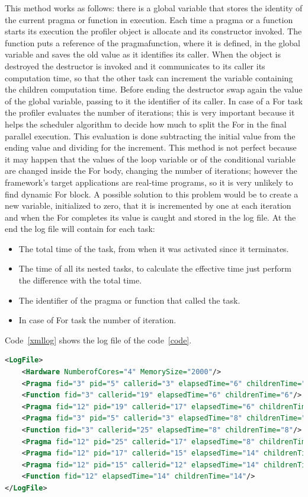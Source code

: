 \documentclass[a4paper,11pt,oneside]{book}
\begin{document}
This method works as follows: there is a global variable that stores the identity of the current pragma or function in execution. Each time a pragma or a function starts its execution the profiler object is allocate and its constructor invoked. The function puts a reference of the pragma\/function, where it is defined, in the global variable and saves the old value as it identifies its caller. When the object is destroyed the destructor is invoked and it communicates to its caller its computation time, so that the other task can increment the variable containing the children computation time. Before ending the destructor swap again the value of the global variable, passing to it the identifier of its caller. 
In case of a For task the profiler evaluates the number of iterations; this is very important because it helps the scheduler algorithm to decide how much to split the For in the final parallel execution. This evaluation is done subtracting the initial value from the ending value and dividing for the increment. This method is not perfect because it may happen that the values of the loop variable or of the conditional variable are changed inside the For body, changing the number of iterations; however the framework’s target applications are real-time programs, so it is very unlikely to find dynamic For block. A possible solution to this problem would be to create a new variable, initialized to zero, that it is incremented by one at each iteration and when the For completes its value is caught and stored in the log file. At the end the log file will contain for each task:

\begin{itemize}
\item The total time of the task, from when it was activated since it terminates.
\item The time of all its nested tasks, to calculate the effective time just perform the difference with the total time.
\item The identifier of the pragma or function that called the task.
\item In case of For task the number of iteration.
\end{itemize}

Code~\ref{xmllog} shows the log file of the code~\ref{code}.

\begin{lstlisting}[language=XML, caption=XML file of the pragma structure of Code~\ref{code}., label=xmllog]
<LogFile>
	<Hardware NumberofCores="4" MemorySize="2000"/>
	<Pragma fid="3" pid="5" callerid="3" elapsedTime="6" childrenTime="0" loops="6"/>
	<Function fid="3" callerid="19" elapsedTime="6" childrenTime="6"/>
	<Pragma fid="12" pid="19" callerid="17" elapsedTime="6" childrenTime="6"/>
	<Pragma fid="3" pid="5" callerid="3" elapsedTime="8" childrenTime="0" loops="8"/>
	<Function fid="3" callerid="25" elapsedTime="8" childrenTime="8"/>
	<Pragma fid="12" pid="25" callerid="17" elapsedTime="8" childrenTime="8"/>
	<Pragma fid="12" pid="17" callerid="15" elapsedTime="14" childrenTime="14"/>
	<Pragma fid="12" pid="15" callerid="12" elapsedTime="14" childrenTime="14"/>
	<Function fid="12" elapsedTime="14" childrenTime="14"/>
</LogFile>
\end{lstlisting}
\end{document}
